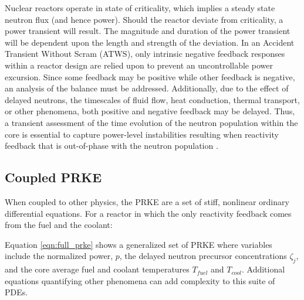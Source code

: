 \documentclass[12pt]{article}
\begin{document}
Nuclear reactors operate in state of criticality, which implies a steady state
neutron flux (and hence power).  Should the reactor deviate from criticality, a
power transient will result. The magnitude and duration of the power transient
will be dependent upon the length and strength of the deviation.  In an
Accident Transient Without Scram (ATWS), only intrinsic negative feedback 
responses within a reactor design
are relied upon to prevent an uncontrollable power excursion.  Since some
feedback may be positive while other feedback is negative, an analysis of the
balance must be addressed. Additionally, due to the effect of delayed neutrons,
the timescales of fluid flow, heat conduction, thermal transport, or other
phenomena, both positive and negative feedback may be delayed. Thus, a transient
assessment of the time evolution of the neutron population within the core is
essential to capture power-level instabilities resulting when reactivity
feedback that is out-of-phase with the neutron population
\cite{stacey_nuclear_2007}.

\subsection{Coupled PRKE}
When coupled to other physics, the PRKE are a set of stiff, nonlinear ordinary 
differential equations.  For a reactor in which the only reactivity feedback 
comes from the fuel and the coolant:



Equation \ref{eqn:full_prke} shows a generalized set of PRKE where
variables include the normalized power, $p$, the delayed neutron precursor
concentrations $\zeta_j$, and the core average fuel and
coolant temperatures $T_{fuel}$ and $T_{cool}$.  Additional equations
quantifying other phenomena can add complexity to this suite of PDEs.




\end{document}
